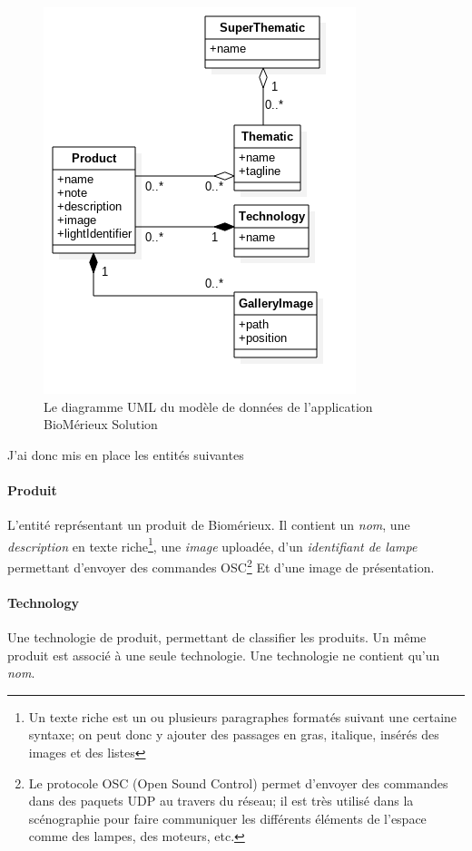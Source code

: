 \bigskip

\begin{figure}[h]
    \centering
    \includegraphics[scale=0.6]{img/uml-bmx-solution.png}
    \caption{Le diagramme UML du modèle de données de l'application BioMérieux Solution}
\end{figure}

\clearpage

J'ai donc mis en place les entités suivantes

\paragraph{Produit} L'entité représentant un produit de Biomérieux.
Il contient un \emph{nom}, une \emph{description} en texte riche\footnote{Un texte riche est un ou plusieurs paragraphes formatés suivant une certaine syntaxe; on peut donc y ajouter des passages en gras, italique, insérés des images et des listes}, une \emph{image} uploadée, d'un \emph{identifiant de lampe} permettant d'envoyer des commandes OSC\footnote{Le protocole OSC (Open Sound Control) permet d'envoyer des commandes dans des paquets UDP au travers du réseau; il est très utilisé dans la scénographie pour faire communiquer les différents éléments de l'espace comme des lampes, des moteurs, etc.} Et d'une image de présentation.

\paragraph{Technology} Une technologie de produit, permettant de classifier les produits.
Un même produit est associé à une seule technologie.
Une technologie ne contient qu'un \emph{nom}.


